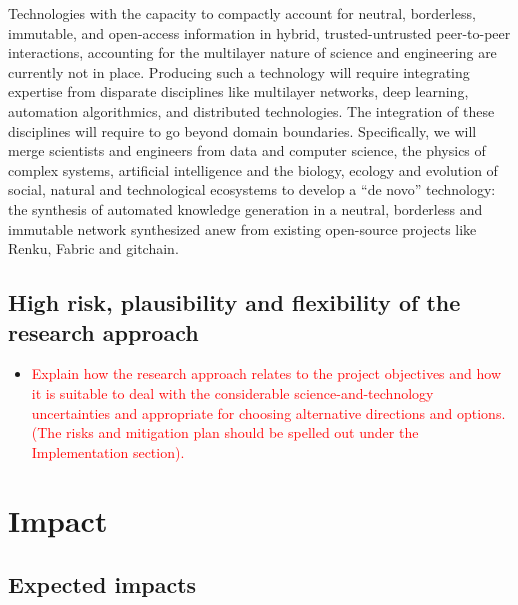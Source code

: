 \documentclass[12pt, a4paper]{article} %
\begin{document}
Technologies with the capacity to compactly account for neutral,
borderless, immutable, and open-access information in hybrid,
trusted-untrusted peer-to-peer interactions, accounting for the
multilayer nature of science and engineering are currently not in
place. Producing such a technology will require integrating expertise
from disparate disciplines like multilayer networks, deep learning,
automation algorithmics, and distributed technologies. The integration
of these disciplines will require to go beyond domain
boundaries. Specifically, we will merge scientists and engineers from
data and computer science, the physics of complex systems, artificial
intelligence and the biology, ecology and evolution of social, natural
and technological ecosystems to develop a “de novo” technology: the
synthesis of automated knowledge generation in a neutral, borderless
and immutable network synthesized anew from existing open-source
projects like Renku, Fabric and gitchain.


\subsection{High risk, plausibility and flexibility of the research approach}


\begin{itemize}
\item \textcolor{red}{Explain how the research approach relates to the
    project objectives and how it is suitable to deal with the
    considerable science-and-technology uncertainties and appropriate
    for choosing alternative directions and options. (The risks and
    mitigation plan should be spelled out under the Implementation
    section).}
\end{itemize}

\section{Impact}

\subsection{Expected impacts}
\end{document}
